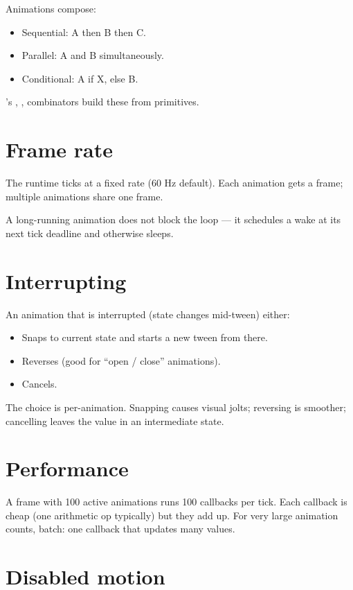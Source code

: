 Animations compose:

\begin{itemize}[leftmargin=*]
  \item Sequential: A then B then C.
  \item Parallel: A and B simultaneously.
  \item Conditional: A if X, else B.
\end{itemize}

\maya{}'s , , 
combinators build these from primitives.

\section{Frame rate}

The runtime ticks at a fixed rate (60 Hz default). Each
animation gets a frame; multiple animations share one
frame.

A long-running animation does not block the loop --- it
schedules a wake at its next tick deadline and otherwise
sleeps.

\section{Interrupting}

An animation that is interrupted (state changes mid-tween)
either:

\begin{itemize}[leftmargin=*]
  \item Snaps to current state and starts a new tween from
    there.
  \item Reverses (good for ``open / close'' animations).
  \item Cancels.
\end{itemize}

The choice is per-animation. Snapping causes visual jolts;
reversing is smoother; cancelling leaves the value in an
intermediate state.

\section{Performance}

A frame with 100 active animations runs 100 callbacks per
tick. Each callback is cheap (one arithmetic op typically)
but they add up. For very large animation counts, batch:
one callback that updates many values.

\section{Disabled motion}


